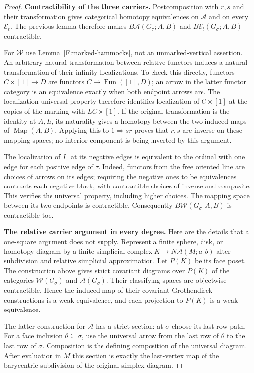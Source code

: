 \begin{proof}
\textbf{Contractibility of the three carriers.}
Postcomposition with $r,s$ and their transformation gives categorical
homotopy equivalences on $\mathcal A$ and on every $\mathcal E_t$.
The previous lemma therefore makes
$B\mathcal A(G_\sigma;A,B)$ and
$B\mathcal E_t(G_\sigma;A,B)$ contractible.

For $\mathcal W$ use Lemma~\ref{F:marked-hammocks}, not an
unmarked-vertical assertion. An arbitrary natural transformation
between relative functors induces a natural transformation of their
infinity localizations. To check this directly, functors
$C\times[1]\to D$ are functors $C\to\operatorname{Fun}([1],D)$;
an arrow in the latter functor category is an equivalence exactly
when both endpoint arrows are. The localization universal property
therefore identifies localization of $C\times[1]$ at the copies of
the marking with $LC\times[1]$. If the original transformation is
the identity at $A,B$, its naturality gives a homotopy between the
two induced maps of $\operatorname{Map}(A,B)$. Applying this to
$1\Rightarrow sr$ proves that $r,s$ are inverse on these mapping
spaces; no interior component is being inverted by this argument.

The localization of $I_\tau$ at its negative edges is equivalent to
the ordinal with one edge for each positive edge of $\tau$. Indeed,
functors from the free oriented line are choices of arrows on its
edges; requiring the negative ones to be equivalences contracts each
negative block, with contractible choices of inverse and composite.
This verifies the universal property, including higher choices.
The mapping space between its two endpoints is contractible.
Consequently $B\mathcal W(G_\sigma;A,B)$ is contractible too.

\textbf{The relative carrier argument in every degree.}
Here are the details that a one-square argument does not supply.
Represent a finite sphere, disk, or homotopy diagram by a finite
simplicial complex $K\to N\mathcal A(M;a,b)$ after subdivision and
relative simplicial approximation. Let $P(K)$ be its face poset.
The construction above gives strict covariant diagrams over $P(K)$
of the categories $\mathcal W(G_\sigma)$ and
$\mathcal A(G_\sigma)$. Their classifying spaces are objectwise
contractible. Hence the induced map of their covariant Grothendieck
constructions is a weak equivalence, and each projection to $P(K)$
is a weak equivalence.

The latter construction for $\mathcal A$ has a strict section: at
$\sigma$ choose its last-row path. For a face inclusion
$\theta\subseteq\sigma$, use the universal arrow from the last
row of $\theta$ to the last row of $\sigma$. Composition is the
defining composition of the universal diagram. After evaluation in
$M$ this section is exactly the last-vertex map of the barycentric
subdivision of the original simplex diagram.


\end{proof}
